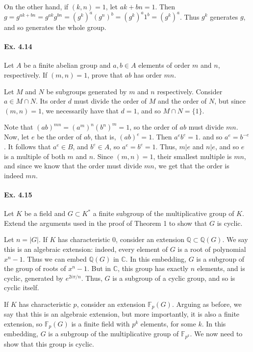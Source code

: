 \documentclass[notitlepage]{article}
\theoremstyle{definition}
\newcommand\C{\mathbb{C}}
\newcommand\Q{\mathbb{Q}}
\begin{document}
On the other hand, if $(k, n) = 1$, let $ak + bn = 1$. Then $g =
g^{ak+bn} = g^{ak}g^{bn} = (g^k)^a (g^n)^b = (g^k)^a 1^b =
(g^k)^a$. Thus $g^k$ generates $g$, and so generates the whole group.


\paragraph{Ex. 4.14}
Let $A$ be a finite abelian group and $a, b \in A$ elements of order
$m$ and $n$, respectively.  If $(m, n) = 1$, prove that $ab$ has order
$mn$.

Let $M$ and $N$ be subgroups generated by $m$ and $n$
respectively. Consider $a \in M \cap N$. Its order $d$ must divide the
order of $M$ and the order of $N$, but since $(m, n) = 1$, we
necessarily have that $d = 1$, and so $M \cap N = \{1\}$.

Note that $(ab)^{mn} = (a^m)^n (b^n)^m = 1$, so the order of $ab$ must
divide $mn$. Now, let $e$ be the order of $ab$, that is, $(ab)^e =
1$. Then $a^e b^e = 1$. and so $a^e = b^{-e}$. It follows that $a^e
\in B$, and $b^e \in A$, so $a^e = b^e = 1$. Thus, $m|e$ and $n|e$,
and so $e$ is a multiple of both $m$ and $n$. Since $(m, n) = 1$,
their smallest multiple is $mn$, and since we know that the order must
divide $mn$, we get that the order is indeed $mn$.

\paragraph{Ex. 4.15}
Let $K$ be a field and $G \subset K^*$ a finite subgroup of the
multiplicative group of $K$.  Extend the arguments used in the proof
of Theorem 1 to show that $G$ is cyclic.

Let $n = |G|$. If $K$ has characteristic $0$, consider an extension
$\Q \subset \Q(G)$. We say this is an algebraic extension: indeed,
every element of $G$ is a root of polynomial $x^{n} - 1$. Thus we can
embed $\Q(G)$ in $\C$. In this embedding, $G$ is a subgroup of the
group of roots of $x^{n} - 1$. But in $\C$, this group has exactly $n$
elements, and is cyclic, generated by $e^{2i \pi / n}$. Thus, $G$ is a
subgroup of a cyclic group, and so is cyclic itself.

If $K$ has characteristic $p$, consider an extension
$\mathbb{F}_p(G)$. Arguing as before, we say that this is an algebraic
extension, but more importantly, it is also a finite extension, so
$\mathbb{F}_p(G)$ is a finite field with $p^k$ elements, for some
$k$. In this embedding, $G$ is a subgroup of the multiplicative group
of $\mathbb{F}_{p^k}$. We now need to show that this group is
cyclic.
\end{document}
